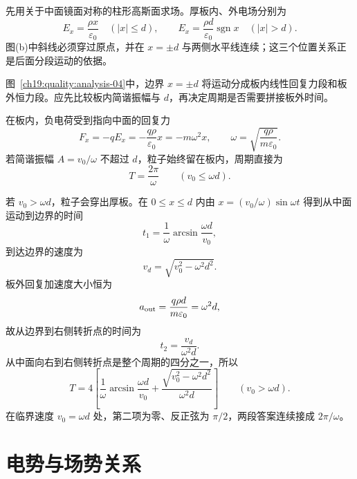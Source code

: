 \begin{xesolution}
先用关于中面镜面对称的柱形高斯面求场。厚板内、外电场分别为
\[
  \boxed{E_x=\frac{\rho x}{\varepsilon_0}\quad(|x|\le d)},
  \qquad
  \boxed{E_x=\frac{\rho d}{\varepsilon_0}\operatorname{sgn}x\quad(|x|>d)}.
\]
图(b)中斜线必须穿过原点，并在 $x=\pm d$ 与两侧水平线连续；这三个位置关系正是后面分段运动的依据。

\begin{qualityfigure}
\chargedSlabFigure
{}\label{ch19:quality:analysis-04}
\end{qualityfigure}
图~\ref{ch19:quality:analysis-04}中，边界 $x=\pm d$ 将运动分成板内线性回复力段和板外恒力段。应先比较板内简谐振幅与 $d$，再决定周期是否需要拼接板外时间。

在板内，负电荷受到指向中面的回复力
\[
  F_x=-qE_x=-\frac{q\rho}{\varepsilon_0}x=-m\omega^2x,
  \qquad
  \boxed{\omega=\sqrt{\frac{q\rho}{m\varepsilon_0}}}.
\]
若简谐振幅 $A=v_0/\omega$ 不超过 $d$，粒子始终留在板内，周期直接为
\[
  \boxed{T=\frac{2\pi}{\omega}}
  \qquad (v_0\le\omega d).
\]

若 $v_0>\omega d$，粒子会穿出厚板。在 $0\le x\le d$ 内由
$x=(v_0/\omega)\sin\omega t$ 得到从中面运动到边界的时间
\[
  t_1=\frac1\omega\arcsin\frac{\omega d}{v_0},
\]
到达边界的速度为
\[
  v_d=\sqrt{v_0^2-\omega^2d^2}.
\]
板外回复加速度大小恒为
\[
  a_{\rm out}=\frac{q\rho d}{m\varepsilon_0}=\omega^2d,
\]
故从边界到右侧转折点的时间为
\[
  t_2=\frac{v_d}{\omega^2d}.
\]
从中面向右到右侧转折点是整个周期的四分之一，所以
\[
  \boxed{T=4\left[
  \frac1\omega\arcsin\frac{\omega d}{v_0}
  +\frac{\sqrt{v_0^2-\omega^2d^2}}{\omega^2d}
  \right]}
  \qquad(v_0>\omega d).
\]
在临界速度 $v_0=\omega d$ 处，第二项为零、反正弦为 $\pi/2$，两段答案连续接成
$2\pi/\omega$。
\end{xesolution}





\graphicspath{{../../../sample/xes-original/thirty-third-section/}}
\section{电势与场势关系}



